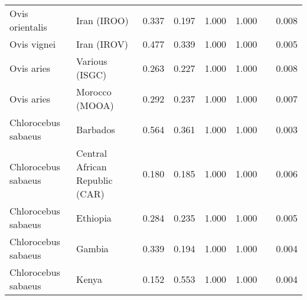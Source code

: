 \begin{center}
\begin{adjustbox}{width = 1\textwidth}
\begin{tabular}{|l|l|r|r|r|r|r|}
     Ovis orientalis &                     Iran (IROO) &                                              0.337 &                                              0.197 &                1.000 &                                  1.000~~ &              0.008 \\
         Ovis vignei &                     Iran (IROV) &                                              0.477 &                                              0.339 &                1.000 &                                  1.000~~ &              0.005 \\
          Ovis aries &                  Various (ISGC) &                                              0.263 &                                              0.227 &                1.000 &                                  1.000~~ &              0.008 \\
          Ovis aries &                  Morocco (MOOA) &                                              0.292 &                                              0.237 &                1.000 &                                  1.000~~ &              0.007 \\
 Chlorocebus sabaeus &                        Barbados &                                              0.564 &                                              0.361 &                1.000 &                                  1.000~~ &              0.003 \\
 Chlorocebus sabaeus &  Central African Republic (CAR) &                                              0.180 &                                              0.185 &                1.000 &                                  1.000~~ &              0.006 \\
 Chlorocebus sabaeus &                        Ethiopia &                                              0.284 &                                              0.235 &                1.000 &                                  1.000~~ &              0.005 \\
 Chlorocebus sabaeus &                          Gambia &                                              0.339 &                                              0.194 &                1.000 &                                  1.000~~ &              0.004 \\
 Chlorocebus sabaeus &                           Kenya &                                              0.152 &                                              0.553 &                1.000 &                                  1.000~~ &              0.004 \\

\end{tabular}
\end{adjustbox}
\end{center}
